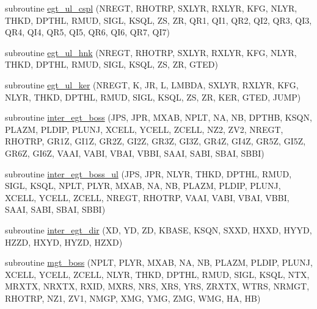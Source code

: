 \begin{DoxyCompactItemize}
\item 
subroutine \hyperlink{Leroi__c_8f90_a55b57146ea180fed3080a010421620fe}{egt\+\_\+ul\+\_\+cspl} (N\+R\+E\+GT, R\+H\+O\+T\+RP, S\+X\+L\+YR, R\+X\+L\+YR, K\+FG, N\+L\+YR, T\+H\+KD, D\+P\+T\+HL, R\+M\+UD, S\+I\+GL, K\+S\+QL, ZS, ZR, Q\+R1, Q\+I1, Q\+R2, Q\+I2, Q\+R3, Q\+I3, Q\+R4, Q\+I4, Q\+R5, Q\+I5, Q\+R6, Q\+I6, Q\+R7, Q\+I7)
\item 
subroutine \hyperlink{Leroi__c_8f90_a1d1da4021109f56adcc9ad84d89cd1b7}{egt\+\_\+ul\+\_\+hnk} (N\+R\+E\+GT, R\+H\+O\+T\+RP, S\+X\+L\+YR, R\+X\+L\+YR, K\+FG, N\+L\+YR, T\+H\+KD, D\+P\+T\+HL, R\+M\+UD, S\+I\+GL, K\+S\+QL, ZS, ZR, G\+T\+ED)
\item 
subroutine \hyperlink{Leroi__c_8f90_a8f7098d7bc36902fbbda312874c15120}{egt\+\_\+ul\+\_\+ker} (N\+R\+E\+GT, K, JR, L, L\+M\+B\+DA, S\+X\+L\+YR, R\+X\+L\+YR, K\+FG, N\+L\+YR, T\+H\+KD, D\+P\+T\+HL, R\+M\+UD, S\+I\+GL, K\+S\+QL, ZS, ZR, K\+ER, G\+T\+ED, J\+U\+MP)
\item 
subroutine \hyperlink{Leroi__c_8f90_a784bd3a2054098804d271da41cb44b09}{inter\+\_\+egt\+\_\+boss} (J\+PS, J\+PR, M\+X\+AB, N\+P\+LT, NA, NB, D\+P\+T\+HB, K\+S\+QN, P\+L\+A\+ZM, P\+L\+D\+IP, P\+L\+U\+NJ, X\+C\+E\+LL, Y\+C\+E\+LL, Z\+C\+E\+LL, N\+Z2, Z\+V2, N\+R\+E\+GT, R\+H\+O\+T\+RP, G\+R1Z, G\+I1Z, G\+R2Z, G\+I2Z, G\+R3Z, G\+I3Z, G\+R4Z, G\+I4Z, G\+R5Z, G\+I5Z, G\+R6Z, G\+I6Z, V\+A\+AI, V\+A\+BI, V\+B\+AI, V\+B\+BI, S\+A\+AI, S\+A\+BI, S\+B\+AI, S\+B\+BI)
\item 
subroutine \hyperlink{Leroi__c_8f90_ae92f09c8cb5ab0bcf37a78e555f55025}{inter\+\_\+egt\+\_\+boss\+\_\+ul} (J\+PS, J\+PR, N\+L\+YR, T\+H\+KD, D\+P\+T\+HL, R\+M\+UD, S\+I\+GL, K\+S\+QL, N\+P\+LT, P\+L\+YR, M\+X\+AB, NA, NB, P\+L\+A\+ZM, P\+L\+D\+IP, P\+L\+U\+NJ, X\+C\+E\+LL, Y\+C\+E\+LL, Z\+C\+E\+LL, N\+R\+E\+GT, R\+H\+O\+T\+RP, V\+A\+AI, V\+A\+BI, V\+B\+AI, V\+B\+BI, S\+A\+AI, S\+A\+BI, S\+B\+AI, S\+B\+BI)
\item 
subroutine \hyperlink{Leroi__c_8f90_ab648c76e3422d73a3d9c0530c4a77dd5}{inter\+\_\+egt\+\_\+dir} (XD, YD, ZD, K\+B\+A\+SE, K\+S\+QN, S\+X\+XD, H\+X\+XD, H\+Y\+YD, H\+Z\+ZD, H\+X\+YD, H\+Y\+ZD, H\+Z\+XD)
\item 
subroutine \hyperlink{Leroi__c_8f90_a4bfc3438dc7d8469c5ec8f1888d7fc50}{mgt\+\_\+boss} (N\+P\+LT, P\+L\+YR, M\+X\+AB, NA, NB, P\+L\+A\+ZM, P\+L\+D\+IP, P\+L\+U\+NJ, X\+C\+E\+LL, Y\+C\+E\+LL, Z\+C\+E\+LL, N\+L\+YR, T\+H\+KD, D\+P\+T\+HL, R\+M\+UD, S\+I\+GL, K\+S\+QL, N\+TX, M\+R\+X\+TX, N\+R\+X\+TX, R\+X\+ID, M\+X\+RS, N\+RS, X\+RS, Y\+RS, Z\+R\+X\+TX, W\+T\+RS, N\+R\+M\+GT, R\+H\+O\+T\+RP, N\+Z1, Z\+V1, N\+M\+GP, X\+MG, Y\+MG, Z\+MG, W\+MG, HA, HB)

\end{DoxyCompactItemize}
